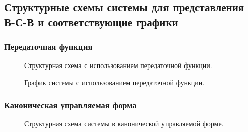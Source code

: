 \documentclass[a5paper, 10pt]{article}
\theoremstyle{definition}
\theoremstyle{plain}
\theoremstyle{remark}
\begin{document}
\subsection{Структурные схемы системы для представления В-С-В и соответствующие графики}

\subsubsection{Передаточная функция}

\begin{figure}[h]
\caption{Структурная схема с использованием передаточной функции.}
\end{figure}

\begin{figure}[h]
\caption{График системы с использованием передаточной функции.}
\end{figure}

\newpage
\subsubsection{Каноническая управляемая форма}

\begin{figure}[h]
\caption{Структурная схема системы в канонической управляемой форме.}
\end{figure}
\end{document}
